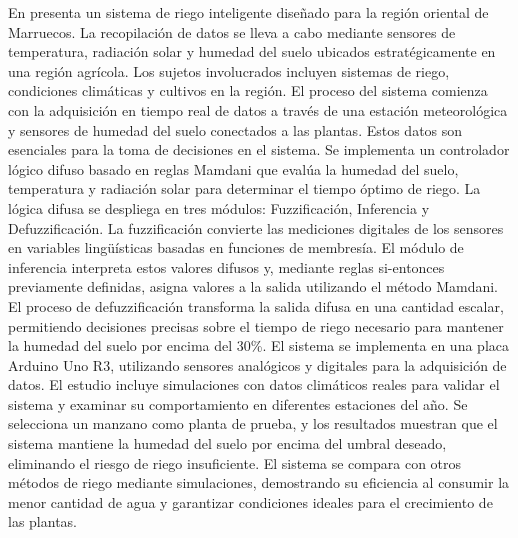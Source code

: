\bigbreak
En \cite{mohammed_intelligent_2021} presenta un sistema de riego inteligente diseñado para la región oriental de Marruecos. La recopilación de datos se lleva a cabo mediante sensores de temperatura, radiación solar y humedad del suelo ubicados estratégicamente en una región agrícola. Los sujetos involucrados incluyen sistemas de riego, condiciones climáticas y cultivos en la región. El proceso del sistema comienza con la adquisición en tiempo real de datos a través de una estación meteorológica y sensores de humedad del suelo conectados a las plantas. Estos datos son esenciales para la toma de decisiones en el sistema. Se implementa un controlador lógico difuso basado en reglas Mamdani que evalúa la humedad del suelo, temperatura y radiación solar para determinar el tiempo óptimo de riego. La lógica difusa se despliega en tres módulos: Fuzzificación, Inferencia y Defuzzificación. La fuzzificación convierte las mediciones digitales de los sensores en variables lingüísticas basadas en funciones de membresía. El módulo de inferencia interpreta estos valores difusos y, mediante reglas si-entonces previamente definidas, asigna valores a la salida utilizando el método Mamdani. El proceso de defuzzificación transforma la salida difusa en una cantidad escalar, permitiendo decisiones precisas sobre el tiempo de riego necesario para mantener la humedad del suelo por encima del 30\%. El sistema se implementa en una placa Arduino Uno R3, utilizando sensores analógicos y digitales para la adquisición de datos. El estudio incluye simulaciones con datos climáticos reales para validar el sistema y examinar su comportamiento en diferentes estaciones del año. Se selecciona un manzano como planta de prueba, y los resultados muestran que el sistema mantiene la humedad del suelo por encima del umbral deseado, eliminando el riesgo de riego insuficiente. El sistema se compara con otros métodos de riego mediante simulaciones, demostrando su eficiencia al consumir la menor cantidad de agua y garantizar condiciones ideales para el crecimiento de las plantas.

